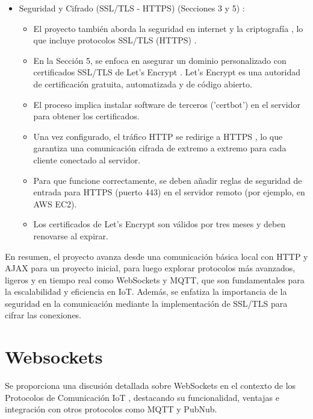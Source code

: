 \documentclass{report}
\begin{document}
\begin{itemize}
    \item Seguridad y Cifrado (SSL/TLS - HTTPS) (Secciones 3 y 5) :
    \begin{itemize}
        \item El proyecto también aborda la  seguridad en internet y la criptografía , lo que incluye protocolos  SSL/TLS (HTTPS) .
        \item En la Sección 5, se enfoca en asegurar un dominio personalizado con certificados  SSL/TLS de Let's Encrypt . Let's Encrypt es una 
        autoridad de certificación gratuita, automatizada y de código abierto.
        \item El proceso implica instalar software de terceros ('certbot') en el servidor para obtener los certificados.
        \item Una vez configurado, el tráfico  HTTP se redirige a HTTPS , lo que garantiza una  comunicación cifrada de extremo a extremo  para 
        cada cliente conectado al servidor.
        \item Para que funcione correctamente, se deben añadir  reglas de seguridad de entrada para HTTPS (puerto 443)  en el servidor remoto 
        (por ejemplo, en AWS EC2).
        \item Los certificados de Let's Encrypt son válidos por tres meses y deben renovarse al expirar.
    \end{itemize}
\end{itemize}
En resumen, el proyecto avanza desde una comunicación básica local con HTTP y AJAX para un proyecto inicial, para luego explorar protocolos más 
avanzados, ligeros y en tiempo real como WebSockets y MQTT, que son fundamentales para la escalabilidad y eficiencia en IoT. Además, se enfatiza 
la importancia de la seguridad en la comunicación mediante la implementación de SSL/TLS para cifrar las conexiones.

\section{Websockets}
Se proporciona una discusión detallada sobre  WebSockets  en el contexto de los  Protocolos de Comunicación IoT , destacando su funcionalidad, 
ventajas e integración con otros protocolos como MQTT y PubNub.
\end{document}
